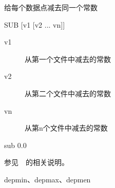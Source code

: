 \label{cmd:sub}

给每个数据点减去同一个常数

\begin{SACSTX}
SUB  [v1 [v2 ... vn]]
\end{SACSTX}

\begin{description}
\item [v1] 从第一个文件中减去的常数
\item [v2] 从第二个文件中减去的常数
\item [vn] 从第n个文件中减去的常数
\end{description}

\begin{SACDFT}
sub 0.0
\end{SACDFT}

参见~~的相关说明。

depmin、depmax、depmen
